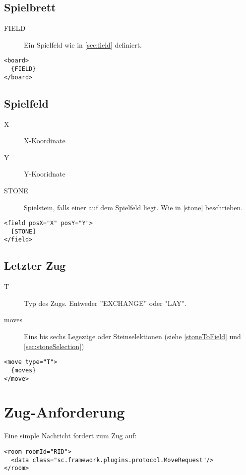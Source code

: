 \documentclass[12pt,a4paper, ngerman, oneside]{scrartcl}
\begin{document}
\subsection{\label{board}Spielbrett}
\begin{description}
\item[FIELD] Ein Spielfeld wie in \ref{sec:field} definiert.
\end{description}
\begin{verbatim}
<board>
  {FIELD}
</board>
\end{verbatim}

\subsection{\label{sec:field}Spielfeld}
\begin{description}
\item[X] X-Koordinate
\item[Y] Y-Kooridnate
\item[STONE] Spielstein, falls einer auf dem Spielfeld liegt. Wie in \ref{stone} beschrieben.
\end{description}
\begin{verbatim}
<field posX="X" posY="Y">
  [STONE]
</field>
\end{verbatim}

\subsection{\label{lastmove}Letzter Zug}
\begin{description}
\item[T] Typ des Zugs. Entweder ''EXCHANGE'' oder "LAY".
\item[moves] Eins bis sechs Legezüge oder Steinselektionen (siehe \ref{stoneToField} und \ref{sec:stoneSelection})
\end{description}
\begin{verbatim}
<move type="T">
  {moves}
</move>
\end{verbatim}

\section{\label{moverequest}Zug-Anforderung}
Eine simple Nachricht fordert zum Zug auf:
\begin{verbatim}
<room roomId="RID">
  <data class="sc.framework.plugins.protocol.MoveRequest"/>
</room>
\end{verbatim}
\end{document}
